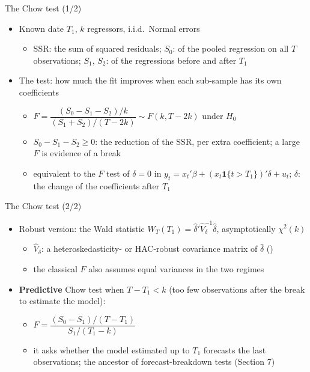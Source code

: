 \begin{frame}{The Chow test (1/2)}
\itemsize{\small}
\begin{itemize}
    \item Known date $T_1$, $k$ regressors, i.i.d.\ Normal errors 
    \begin{itemize}
        \item SSR: the sum of squared residuals; $S_0$: of the pooled regression on all $T$ observations; $S_1$, $S_2$: of the regressions before and after $T_1$
    \end{itemize}
    \item The test: how much the fit improves when each sub-sample has its own coefficients
    \begin{itemize}
        \item $F = \dfrac{(S_0 - S_1 - S_2)/k}{(S_1 + S_2)/(T - 2k)} \sim F(k, T - 2k)$ under $H_0$
        \item $S_0 - S_1 - S_2 \ge 0$: the reduction of the SSR, per extra coefficient; a large $F$ is evidence of a break
        \item equivalent to the $F$ test of $\delta = 0$ in $y_t = x_t'\beta + (x_t \mathbf 1\{t > T_1\})'\delta + u_t$; $\delta$: the change of the coefficients after $T_1$
    \end{itemize}
\end{itemize}
\end{frame}

\begin{frame}{The Chow test (2/2)}
\itemsize{\small}
\begin{itemize}
    \item Robust version: the Wald statistic $W_T(T_1) = \hat\delta'\hat V_\delta^{-1}\hat\delta$, asymptotically $\chi^2(k)$
    \begin{itemize}
        \item $\hat V_\delta$: a heteroskedasticity- or HAC-robust covariance matrix of $\hat\delta$ ()
        \item the classical $F$ also assumes equal variances in the two regimes
    \end{itemize}
    \item \textbf{Predictive} Chow test when $T - T_1 < k$ (too few observations after the break to estimate the model):
    \begin{itemize}
        \item $F = \dfrac{(S_0 - S_1)/(T - T_1)}{S_1/(T_1 - k)}$
        \item it asks whether the model estimated up to $T_1$ forecasts the last observations; the ancestor of forecast-breakdown tests (Section 7)
    \end{itemize}
\end{itemize}
\end{frame}

